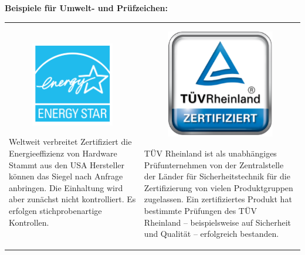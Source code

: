 \documentclass[10pt]{article}
\begin{document}
\begin{flushleft}
\textbf{Beispiele für Umwelt- und Prüfzeichen:}

\begin{table}[H]
    \centering
    \begin{tabular}{|p{}|p{}|}
    \hline
    
    \begin{figure}
    \includegraphics{energystar.png}
    \end{figure}
    
    Weltweit verbreitet
    Zertifiziert die Energieeffizienz von Hardware
    Stammt aus den USA
    Hersteller können das Siegel nach Anfrage anbringen. Die Einhaltung wird aber zunächst nicht kontrolliert.
    Es erfolgen stichprobenartige Kontrollen.

    &
    
    \begin{figure}
    \includegraphics{tuvrheinland.png}
    \end{figure}
    
    TÜV Rheinland ist als unabhängiges Prüfunternehmen von der Zentralstelle der Länder für Sicherheitstechnik für die Zertifizierung von vielen Produktgruppen zugelassen.
    Ein zertifiziertes Produkt hat bestimmte Prüfungen des TÜV Rheinland – beispielsweise auf Sicherheit und Qualität – erfolgreich bestanden. 
    

\end{tabular}
\end{table}
\end{flushleft}
\end{document}
